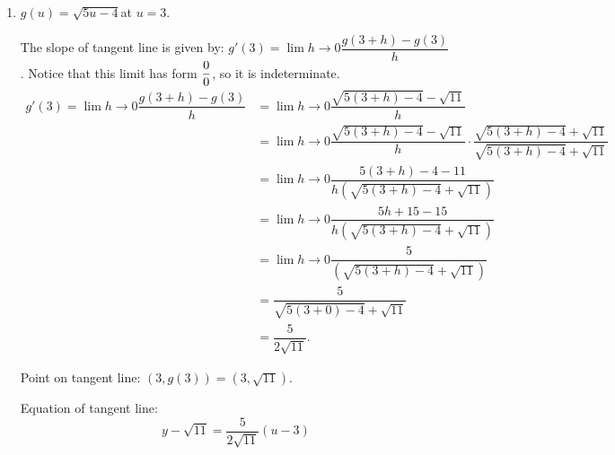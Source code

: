 \documentclass{ximera}
\begin{document}
\begin{problem}
\begin{enumerate}
    \item
      $g(u) = \sqrt{5u-4}$\quad at $u = 3$.
      \begin{explanation}
        The slope of tangent line is given by: $\displaystyle g'(3)= \displaystyle \lim{h \to 0} \dfrac{g(3+h) - g(3)}{h}$.  Notice that this limit has form $\dfrac{0}{0}$, so it is indeterminate. 
        \begin{align*}
          g'(3)= \displaystyle \lim{h \to 0} \dfrac{g(3+h) - g(3)}{h}
            &= \displaystyle \lim{h \to 0} \dfrac{\sqrt{5(3+h) - 4} - \sqrt{11}}{h}\\
          		&=\displaystyle \lim{h \to 0} \dfrac{\sqrt{5(3+h) - 4} - \sqrt{11}}{h} \cdot \dfrac{\sqrt{5(3+h) - 4} + \sqrt{11}}{\sqrt{5(3+h) - 4} + \sqrt{11}} \\
		&= \displaystyle \lim{h \to 0} \dfrac{5(3+h) - 4 - 11}{h \left( \sqrt{5(3+h) - 4} + \sqrt{11} \right) }  \\
		&= \displaystyle \lim{h \to 0} \dfrac{5h + 15 - 15}{h \left( \sqrt{5(3+h) - 4} + \sqrt{11} \right) }  \\
		&= \displaystyle \lim{h \to 0} \dfrac{5}{\left( \sqrt{5(3+h) - 4} + \sqrt{11} \right) }  \\
		&= \dfrac{5}{\sqrt{5(3+0) - 4} + \sqrt{11}}  \\
		&= \dfrac{5}{2 \sqrt{11}}.
        \end{align*}

        Point on tangent line: $(3, g(3)) = (3, \sqrt{11})$.

        Equation of tangent line:
		\[ y - \sqrt{11} =  \dfrac{5}{2 \sqrt{11}} \left( u - 3\right) \]
      \end{explanation}


\end{enumerate}
\end{problem}
\end{document}
